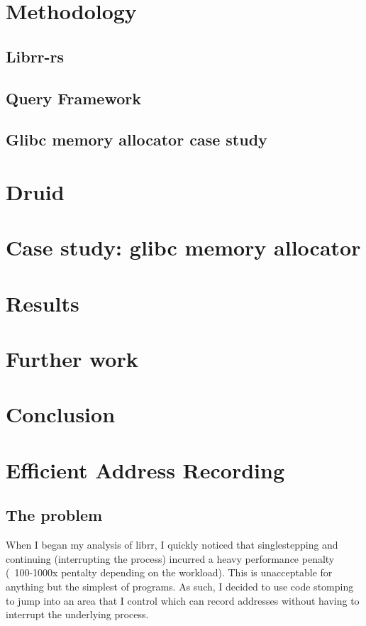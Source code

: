 \section{Methodology}

\subsection{Librr-rs}
\subsection{Query Framework}


\subsection{Glibc memory allocator case study}


\section{Druid}


\section{Case study: glibc memory allocator}

\section{Results}
\subsection{}
\section{Further work}
\section{Conclusion}

\section{Efficient Address Recording}

\subsection{The problem}
When I began my analysis of librr, I quickly noticed that singlestepping and continuing (interrupting the process) incurred a heavy performance penalty (~100-1000x pentalty depending on the workload). This is unacceptable for anything but the simplest of programs. As such, I decided to use code stomping to jump into an area that I control which can record addresses without having to interrupt the underlying process. 

